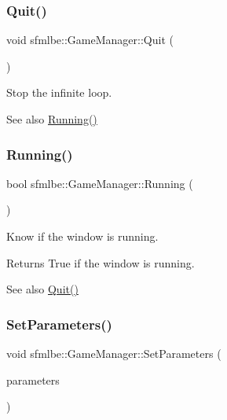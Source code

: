 \subsubsection{\texorpdfstring{Quit()}{Quit()}}
{\footnotesize\ttfamily void sfmlbe\+::\+Game\+Manager\+::\+Quit (\begin{DoxyParamCaption}{ }\end{DoxyParamCaption})}



Stop the infinite loop. 

\begin{DoxySeeAlso}{See also}
\mbox{\hyperlink{classsfmlbe_1_1_game_manager_abf3416b7fcada3b78823e3e1709922d0}{Running()}} 
\end{DoxySeeAlso}
\mbox{\label{classsfmlbe_1_1_game_manager_abf3416b7fcada3b78823e3e1709922d0}} 
\subsubsection{\texorpdfstring{Running()}{Running()}}
{\footnotesize\ttfamily bool sfmlbe\+::\+Game\+Manager\+::\+Running (\begin{DoxyParamCaption}{ }\end{DoxyParamCaption})\hspace{0.3cm}{\ttfamily [inline]}}



Know if the window is running. 

\begin{DoxyReturn}{Returns}
True if the window is running. 
\end{DoxyReturn}
\begin{DoxySeeAlso}{See also}
\mbox{\hyperlink{classsfmlbe_1_1_game_manager_a17d8f897440b021f4eb1884cb3a5d521}{Quit()}} 
\end{DoxySeeAlso}
\mbox{\label{classsfmlbe_1_1_game_manager_aaea9fd274be0e81c1e493e9a89edc7eb}} 
\subsubsection{\texorpdfstring{Set\+Parameters()}{SetParameters()}}
{\footnotesize\ttfamily void sfmlbe\+::\+Game\+Manager\+::\+Set\+Parameters (\begin{DoxyParamCaption}\item[{\mbox{\hyperlink{structsfmlbe_1_1_game_parameters}{Game\+Parameters}}}]{parameters }\end{DoxyParamCaption})}



